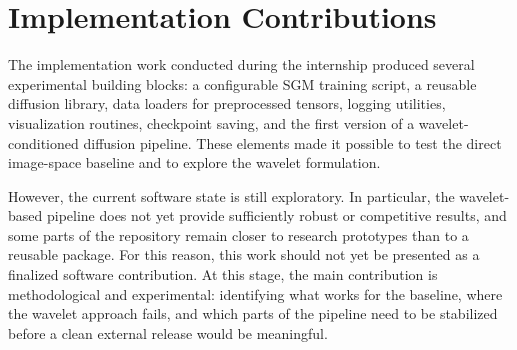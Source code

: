 \section{Implementation Contributions}

The implementation work conducted during the internship produced several
experimental building blocks: a configurable SGM training script, a reusable
diffusion library, data loaders for preprocessed tensors, logging utilities,
visualization routines, checkpoint saving, and the first version of a
wavelet-conditioned diffusion pipeline. These elements made it possible to
test the direct image-space baseline and to explore the wavelet formulation.

However, the current software state is still exploratory. In particular, the
wavelet-based pipeline does not yet provide sufficiently robust or competitive
results, and some parts of the repository remain closer to research prototypes
than to a reusable package. For this reason, this work should not yet be
presented as a finalized software contribution. At this stage, the main
contribution is methodological and experimental: identifying what works for the
baseline, where the wavelet approach fails, and which parts of the pipeline
need to be stabilized before a clean external release would be meaningful.
